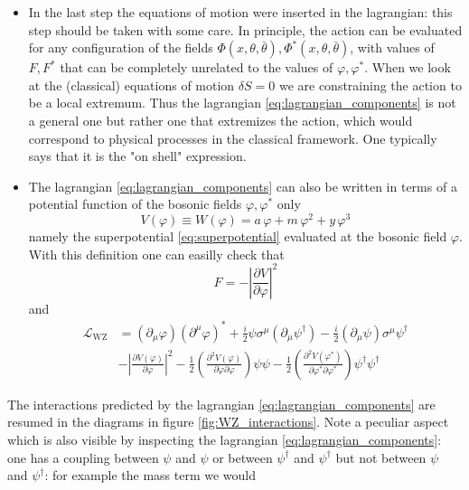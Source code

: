 \documentclass[12pt]{article}
\begin{document}
\begin{itemize}
  \item In the last step the equations of motion were inserted in the lagrangian: this step should be taken with some care. In principle, the action can be evaluated for any configuration of the fields $\Phi(x, \theta, \bar\theta), \Phi^*(x,\theta, \bar\theta)$, with values of $F, F^*$ that can be completely unrelated to the values of $\varphi, \varphi^*$. 
  When we look at the (classical) equations of motion $\delta S = 0$ we are constraining the action to be a local extremum. Thus the lagrangian \ref{eq:lagrangian_components} is not a general one but rather one that extremizes the action, which would correspond to physical processes in the classical framework. One typically says that it is the "on shell" expression.
  \item The lagrangian \ref{eq:lagrangian_components} can also be written in terms of a potential function of the bosonic fields $\varphi, \varphi^*$ only
  \begin{equation*}
    V(\varphi) \equiv W(\varphi) = a \, \varphi + m \, \varphi^2 + y \, \varphi^3
  \end{equation*}
  namely the superpotential \ref{eq:superpotential} evaluated at the bosonic field $\varphi$. With this definition one can easilly check that
  \begin{equation*}
    F = -\left|\frac{\partial V}{\partial \varphi}\right|^2
  \end{equation*}
  and 
  \begin{equation*}
    \begin{aligned}
        \mathcal{L}_{\mathrm{WZ}} &=\left(\partial_{\mu} \varphi\right)\left(\partial^{\mu} \varphi\right)^{*}+\frac{i}{2} \psi \sigma^{\mu}\left(\partial_{\mu} \psi^{\dagger}\right)-\frac{i}{2}\left(\partial_{\mu} \psi\right) \sigma^{\mu} \psi^{\dagger} \\
        &-\left|\frac{\partial V\left(\varphi\right)}{\partial \varphi}\right|^{2}-\frac{1}{2}\left(\frac{\partial^{2} V\left(\varphi\right)}{\partial \varphi \partial \varphi}\right) \psi \psi-\frac{1}{2}\left(\frac{\partial^{2} V\left(\varphi^*\right)}{\partial \varphi^{*} \partial \varphi^{*}}\right) \psi^{\dagger} \psi^{\dagger}
    \end{aligned}
\end{equation*}
\end{itemize}
The interactions predicted by the lagrangian \ref{eq:lagrangian_components} are resumed in the diagrams in figure \ref{fig:WZ_interactions}. Note a peculiar aspect which is also visible by inspecting the lagrangian \ref{eq:lagrangian_components}: one has a coupling between $\psi$ and $\psi$ or between $\psi^\dagger$ and  $\psi^\dagger$ but not between $\psi$ and $\psi^\dagger$: for example the mass term we would 
\end{document}
